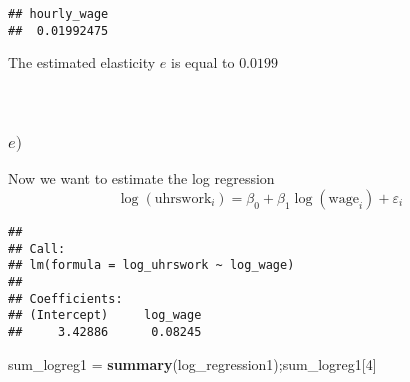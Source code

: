\documentclass[
]{article}
\newenvironment{Shaded}{\begin{snugshade}}{\end{snugshade}}
\newcommand{\DataTypeTok}[1]{\textcolor[rgb]{0.13,0.29,0.53}{#1}}
\newcommand{\DecValTok}[1]{\textcolor[rgb]{0.00,0.00,0.81}{#1}}
\newcommand{\KeywordTok}[1]{\textcolor[rgb]{0.13,0.29,0.53}{\textbf{#1}}}
\newcommand{\NormalTok}[1]{#1}
\newcommand{\OperatorTok}[1]{\textcolor[rgb]{0.81,0.36,0.00}{\textbf{#1}}}
\newcommand{\OtherTok}[1]{\textcolor[rgb]{0.56,0.35,0.01}{#1}}
\newcommand{\StringTok}[1]{\textcolor[rgb]{0.31,0.60,0.02}{#1}}
\begin{document}
\begin{Shaded}
\end{Shaded}

\begin{verbatim}
## hourly_wage 
##  0.01992475
\end{verbatim}

The estimated elasticity \(e\) is equal to \(0.0199\)\\
~\\
~\\

\hypertarget{e}{%
\subsubsection{\texorpdfstring{\(e)\)}{e)}}\label{e}}

\hfill\break
Now we want to estimate the log regression
\[\log(\textrm{uhrswork}_i) = \beta_0 + \beta_1 \log(\textrm{wage}_i) + \varepsilon_i\]

\begin{Shaded}
\end{Shaded}

\begin{verbatim}
## 
## Call:
## lm(formula = log_uhrswork ~ log_wage)
## 
## Coefficients:
## (Intercept)     log_wage  
##     3.42886      0.08245
\end{verbatim}

\begin{Shaded}
\begin{Highlighting}[]
\NormalTok{sum\_logreg1 =}\StringTok{ }\KeywordTok{summary}\NormalTok{(log\_regression1);sum\_logreg1[}\DecValTok{4}\NormalTok{]}
\end{Highlighting}
\end{Shaded}
\end{document}
